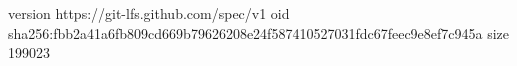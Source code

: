 version https://git-lfs.github.com/spec/v1
oid sha256:fbb2a41a6fb809cd669b79626208e24f587410527031fdc67feec9e8ef7c945a
size 199023
